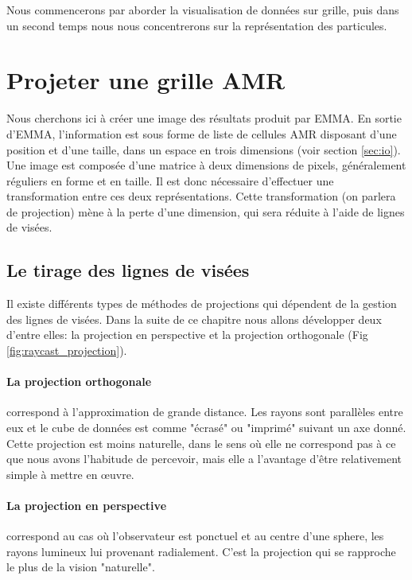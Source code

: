 Nous commencerons par aborder la visualisation de données sur grille, puis dans un second temps nous nous concentrerons sur la représentation des particules.


\section{Projeter une grille AMR}

Nous cherchons ici à créer une image des résultats produit par EMMA.
En sortie d'EMMA, l'information est sous forme de liste de cellules \ac{AMR} disposant d'une position et d'une taille, dans un espace en trois dimensions (voir section \ref{sec:io}).
Une image est composée d'une matrice à deux dimensions de pixels, généralement réguliers en forme et en taille.
Il est donc nécessaire d'effectuer une transformation entre ces deux représentations.
Cette transformation (on parlera de projection) mène à la perte d'une dimension, qui sera réduite à l'aide de lignes de visées.

\subsection{Le tirage des lignes de visées}

Il existe différents types de méthodes de projections qui dépendent de la gestion des lignes de visées.
Dans la suite de ce chapitre nous allons développer deux d'entre elles: la projection en perspective et la projection orthogonale (Fig \ref{fig:raycast_projection}).

\paragraph{La projection orthogonale} correspond à l'approximation de grande distance.
Les rayons sont parallèles entre eux et le cube de données est comme "écrasé" ou "imprimé" suivant un axe donné.
Cette projection est moins naturelle, dans le sens où elle ne correspond pas à ce que nous avons l'habitude de percevoir, mais elle a l'avantage d'être relativement simple à mettre en œuvre.

\paragraph{La projection en perspective} correspond au cas où l'observateur est ponctuel et au centre d'une sphere, les rayons lumineux lui provenant radialement.
C'est la projection qui se rapproche le plus de la vision "naturelle".

